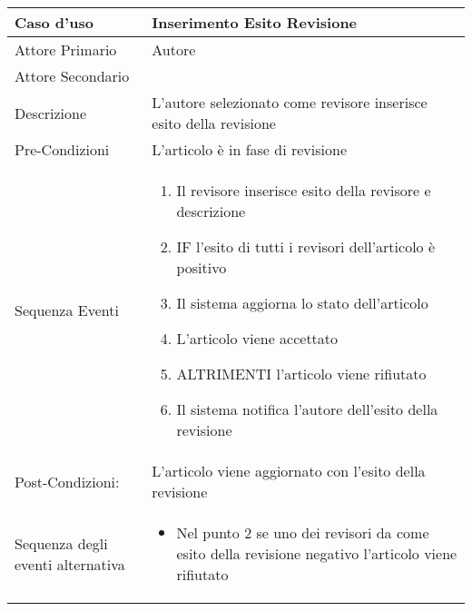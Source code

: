 \begin{tabular}{|p{3cm}|p{7cm}|}
\hline 
\rowcolor{Orchid}
Caso d'uso & Inserimento Esito Revisione\\
\hline
Attore Primario & Autore \\
\hline
Attore Secondario & \\
\hline
Descrizione & L'autore selezionato come revisore inserisce esito della revisione\\
\hline
Pre-Condizioni& L'articolo è in fase di revisione\\
\hline
  Sequenza Eventi&
                   \begin{enumerate}
                   \item Il revisore inserisce esito della revisore e descrizione
                   \item IF l'esito di tutti i revisori dell'articolo è positivo
                   \item Il sistema aggiorna lo stato dell'articolo
                   \item L'articolo viene accettato
                   \item ALTRIMENTI l'articolo viene rifiutato
                   \item Il sistema notifica l'autore dell'esito della revisione
                   \end{enumerate}\\
\hline
Post-Condizioni: & L'articolo viene aggiornato con l'esito della revisione\\
\hline
Sequenza degli eventi alternativa & \begin{itemize}
  \item Nel punto 2 se uno dei revisori da come esito della revisione negativo l'articolo viene rifiutato
\end{itemize} \\
\hline
\end{tabular}

